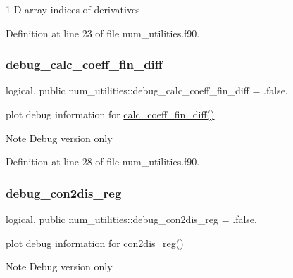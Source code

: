 1-\/D array indices of derivatives 



Definition at line 23 of file num\+\_\+utilities.\+f90.

\mbox{\label{namespacenum__utilities_ae20985c8049d39f987fa23d728688cbc}} 
\subsubsection{\texorpdfstring{debug\+\_\+calc\+\_\+coeff\+\_\+fin\+\_\+diff}{debug\_calc\_coeff\_fin\_diff}}
{\footnotesize\ttfamily logical, public num\+\_\+utilities\+::debug\+\_\+calc\+\_\+coeff\+\_\+fin\+\_\+diff = .false.}



plot debug information for \hyperlink{namespacenum__utilities_a4dffe3beba7165dd17cff19a99a9e2ac}{calc\+\_\+coeff\+\_\+fin\+\_\+diff()} 

\begin{DoxyNote}{Note}
Debug version only 
\end{DoxyNote}


Definition at line 28 of file num\+\_\+utilities.\+f90.

\mbox{\label{namespacenum__utilities_ab7138a230a3c494c7a2b71b2a7fffc0a}} 
\subsubsection{\texorpdfstring{debug\+\_\+con2dis\+\_\+reg}{debug\_con2dis\_reg}}
{\footnotesize\ttfamily logical, public num\+\_\+utilities\+::debug\+\_\+con2dis\+\_\+reg = .false.}



plot debug information for con2dis\+\_\+reg() 

\begin{DoxyNote}{Note}
Debug version only 
\end{DoxyNote}


